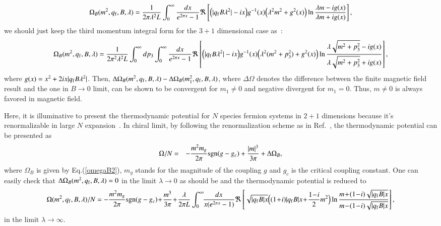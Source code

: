 \documentclass[aps,prd,amsmath,two column,amssymb,showpacs]{revtex4}
\begin{document}
\begin{widetext} 
	\begin{eqnarray}\label{omegaB2}
	\Omega_B(m^2,q_{\rm f},B,\lambda)={1\over2\pi\lambda^2L}\int_0^\infty{dx\over e^{2\pi x}-1}\Re\left[\Big(|q_{\rm f}B\lambda^2|-ix\Big)g^{-1}(x)\Big(\lambda^2m^2+g^2(x)\Big)\ln{\lambda m-ig(x)\over \lambda m+ig(x)}\right],
	\end{eqnarray}
we should just keep the third momentum integral form for the $3+1$ dimensional case as~\cite{Dunne:1997kw}:
	\begin{eqnarray}
	\Omega_B(m^2,q_{\rm f},B,\lambda)={1\over2\pi^2\lambda^2L}\int_0^\infty dp_3\int_0^\infty{dx\over e^{2\pi x}-1}\Re\left[\Big(|q_{\rm f}B\lambda^2|-ix\Big)g^{-1}(x)\Big(\lambda^2(m^2+p_3^2)+g^2(x)\Big)\ln{\lambda\sqrt{m^2+p_3^2}-ig(x)\over \lambda \sqrt{m^2+p_3^2}+ig(x)}\right],
	\end{eqnarray}
where $g(x)=x^2+2ix|q_{\rm f}B\lambda^2|$. Then, $\Delta \Omega_B(m^2,q_{\rm f},B,\lambda)-\Delta \Omega_B(m_1^2,q_{\rm f},B,\lambda)$, where $\Delta \Omega$ denotes the difference between the finite magnetic field result and the one in $B\rightarrow0$ limit, can be shown to be convergent for $m_1\neq0$ and negative divergent for $m_1=0$.  Thus, $m\neq0$ is always favored in magnetic field. 
	
Here, it is illuminative to present the thermodynamic potential for $N$ species fermion systems in $2+1$ dimensions because it's renormalizable in large $N$ expansion~\cite{Rosenstein:1990nm}. In chiral limit, by following the renormalization scheme as in Ref.~\cite{Cao:2014uva}, the thermodynamic potential can be presented as
\begin{eqnarray}\label{omega2}
\Omega/N&=&-{m^2m_g\over 2\pi}{\rm sgn}(g-g_c)+{|m|^3\over3\pi}+\Delta\Omega_B,
\end{eqnarray}
where $\Omega_B$ is given by Eq.(\ref{omegaB2}), $m_g$ stands for the magnitude of the coupling $g$ and $g_c$ is the critical coupling constant. One can easily check that $\Delta\Omega_B(m^2,q_{\rm f},B,\lambda)=0$ in the limit $\lambda\rightarrow0$ as should be and the thermodynamic potential is reduced to
\begin{eqnarray}
\Omega(m^2,q_{\rm f},B,\lambda)/N=-{m^2m_g\over 2\pi}{\rm sgn}(g-g_c)\!+\!{m^3\over3\pi}\!+\!{\lambda\over2\pi L}\int_0^\infty\!\!{dx\over x(e^{2\pi x}-1)}\Re\left[\sqrt{|q_{\rm f}B|x}\Big((1\!+\!i)|q_{\rm f}B|x\!+\!{1\!-\!i\over2}m^2\Big)\ln{m\!+\!(1\!-\!i)\sqrt{|q_{\rm f}B|x}\over m\!-\!(1\!-\!i)\sqrt{|q_{\rm f}B|x}}\right],
\end{eqnarray}
in the limit $\lambda\rightarrow\infty$.
\end{widetext}
\end{document}
